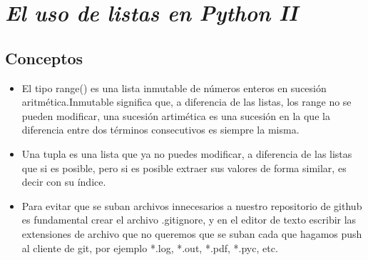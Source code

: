 \documentclass{book}
\begin{document}
\begin{itemize}
	\end{itemize}
	
	


	\section{\textit{El uso de listas en Python II}}
\begin{flushright}
	\date{21 de enero de 2019}
\end{flushright}

	\subsection {Conceptos}
	\begin{itemize}
		\item El tipo range() es una lista inmutable de números enteros en sucesión aritmética.Inmutable significa que, a diferencia de las listas, los range no se pueden modificar, una sucesión artimética es una sucesión en la que la diferencia entre dos términos consecutivos es siempre la misma.
		
		\item Una tupla es una lista que ya no puedes modificar, a diferencia de las listas que si es posible, pero si es posible extraer sus valores de forma similar, es decir con su índice.
		\item Para evitar que se suban archivos innecesarios a nuestro repositorio de github es fundamental crear el archivo .gitignore, y en el editor de texto escribir las extensiones de archivo que no queremos que se suban cada que hagamos push al cliente de git, por ejemplo *.log, *.out, *.pdf, *.pyc, etc.
	\end{itemize}
	
	
	
\end{document}
